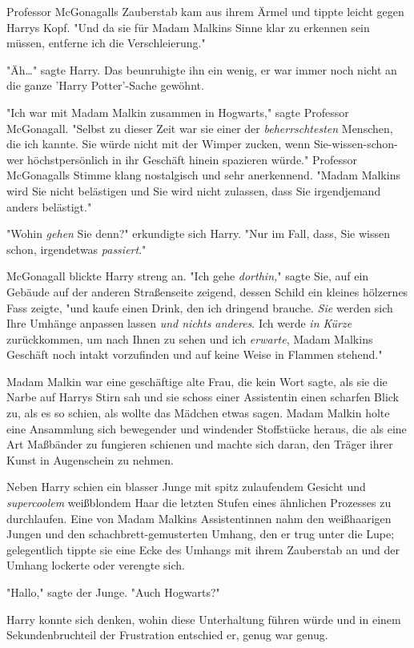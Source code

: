{Professor McGonagalls Zauberstab kam aus ihrem Ärmel und tippte leicht gegen Harrys Kopf. "Und da sie für Madam Malkins Sinne klar zu erkennen sein müssen, entferne ich die Verschleierung."

"Äh…" sagte Harry. Das beunruhigte ihn ein wenig, er war immer noch nicht an die ganze 'Harry Potter'-Sache gewöhnt.

"Ich war mit Madam Malkin zusammen in Hogwarts," sagte Professor McGonagall. "Selbst zu dieser Zeit war sie einer der \emph{beherrschtesten} Menschen, die ich kannte. Sie würde nicht mit der Wimper zucken, wenn Sie-wissen-schon-wer höchstpersönlich in ihr Geschäft hinein spazieren würde." Professor McGonagalls Stimme klang nostalgisch und sehr anerkennend. "Madam Malkins wird Sie nicht belästigen und Sie wird nicht zulassen, dass Sie irgendjemand anders belästigt."

"Wohin \emph{gehen} Sie denn?" erkundigte sich Harry. "Nur im Fall, dass, Sie wissen schon, irgendetwas \emph{passiert}."

McGonagall blickte Harry streng an. "Ich gehe \emph{dorthin,}" sagte Sie, auf ein Gebäude auf der anderen Straßenseite zeigend, dessen Schild ein kleines hölzernes Fass zeigte, "und kaufe einen Drink, den ich dringend brauche. \emph{Sie} werden sich Ihre Umhänge anpassen lassen \emph{und nichts anderes}. Ich werde \emph{in Kürze} zurückkommen, um nach Ihnen zu sehen und ich \emph{erwarte}, Madam Malkins Geschäft noch intakt vorzufinden und auf keine Weise in Flammen stehend."

Madam Malkin war eine geschäftige alte Frau, die kein Wort sagte, als sie die Narbe auf Harrys Stirn sah und sie schoss einer Assistentin einen scharfen Blick zu, als es so schien, als wollte das Mädchen etwas sagen. Madam Malkin holte eine Ansammlung sich bewegender und windender Stoffstücke heraus, die als eine Art Maßbänder zu fungieren schienen und machte sich daran, den Träger ihrer Kunst in Augenschein zu nehmen.

Neben Harry schien ein blasser Junge mit spitz zulaufendem Gesicht und \emph{supercoolem} weißblondem Haar die letzten Stufen eines ähnlichen Prozesses zu durchlaufen. Eine von Madam Malkins Assistentinnen nahm den weißhaarigen Jungen und den schachbrett-gemusterten Umhang, den er trug unter die Lupe; gelegentlich tippte sie eine Ecke des Umhangs mit ihrem Zauberstab an und der Umhang lockerte oder verengte sich.

"Hallo," sagte der Junge. "Auch Hogwarts?"

Harry konnte sich denken, wohin diese Unterhaltung führen würde und in einem Sekundenbruchteil der Frustration entschied er, genug war genug.

}
